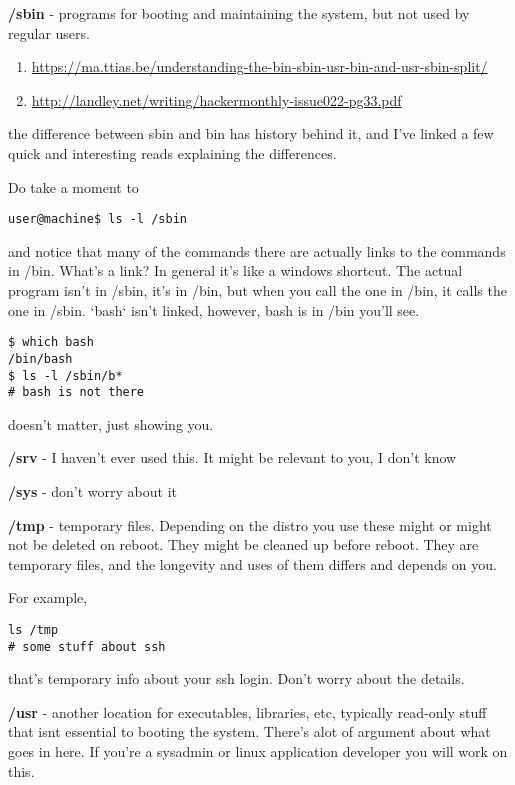 \documentclass[10pt]{article}
\begin{document}
{\color{red} \textbf{/sbin}} - programs for booting and maintaining the system, but not used by regular users. 

\begin{enumerate}
\item \url{https://ma.ttias.be/understanding-the-bin-sbin-usr-bin-and-usr-sbin-split/ }
\item \url{http://landley.net/writing/hackermonthly-issue022-pg33.pdf}
\end{enumerate}

the difference between sbin and bin has history behind it, and I've linked a few quick and interesting reads explaining the differences.

Do take a moment to 


\begin{lstlisting}
user@machine$ ls -l /sbin
\end{lstlisting}

 and notice that many of the commands there are actually links to the commands in /bin. What's a link? In general it's like a windows shortcut. The actual program isn't in /sbin, it's in /bin, but when you call the one in /bin, it calls the one in /sbin. `bash` isn't linked, however, bash is in /bin you'll see. 

\begin{lstlisting}
$ which bash 
/bin/bash
$ ls -l /sbin/b*
# bash is not there
\end{lstlisting}

doesn't matter, just showing you.

{\color{red} \textbf{/srv}} - I haven't ever used this. It might be relevant to you, I don't know

{\color{red} \textbf{/sys}} - don't worry about it

{\color{red} \textbf{/tmp}} - temporary files. Depending on the distro you use these might or might not be deleted on reboot. They might be cleaned up before reboot. They are temporary files, and the longevity and uses of them differs and depends on you.

For example, 

\begin{lstlisting}
ls /tmp
# some stuff about ssh
\end{lstlisting}

that's temporary info about your ssh login. Don't worry about the details. 

{\color{red} \textbf{/usr}} - another location for executables, libraries, etc, typically read-only stuff that isnt essential to booting the system. There's alot of argument about what goes in here. If you're a sysadmin or linux application developer you will work on this.
\end{document}
